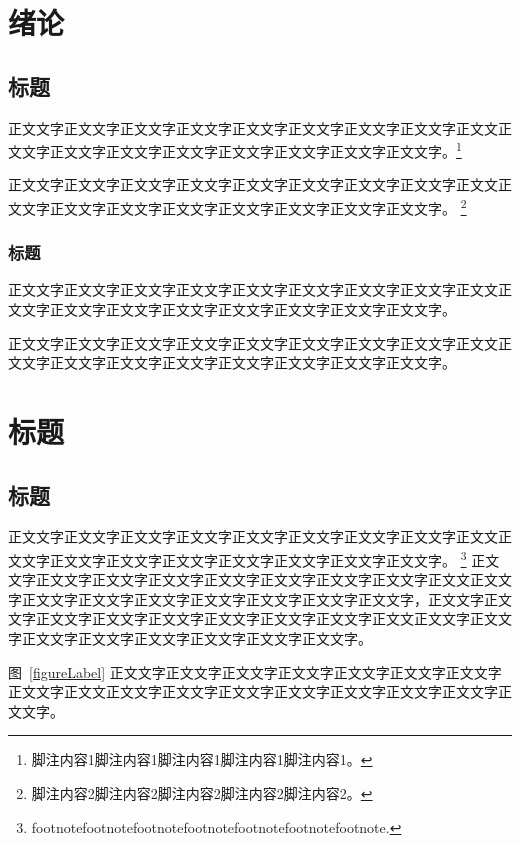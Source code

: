 \documentclass[twoside]{thesis-cls-Miya} %
\begin{document}
\tableofcontents

\mainmatter

\chapter{绪论} %

\section{标题}
正文文字正文文字正文文字正文文字正文文字正文文字正文文字正文文字正文文正文文字正文文字正文文字正文文字正文文字正文文字正文文字正文文字。\footnote{脚注内容1脚注内容1脚注内容1脚注内容1脚注内容1。}

正文文字正文文字正文文字正文文字正文文字正文文字正文文字正文文字正文文正文文字正文文字正文文字正文文字正文文字正文文字正文文字正文文字。
\footnote{脚注内容2脚注内容2脚注内容2脚注内容2脚注内容2。 }

\subsection{标题}
正文文字正文文字正文文字正文文字正文文字正文文字正文文字正文文字正文文正文文字正文文字正文文字正文文字正文文字正文文字正文文字正文文字。

正文文字正文文字正文文字正文文字正文文字正文文字正文文字正文文字正文文正文文字正文文字正文文字正文文字正文文字正文文字正文文字正文文字。

\chapter{标题}%

\section{标题}

正文文字正文文字正文文字正文文字正文文字正文文字正文文字正文文字正文文正文文字正文文字正文文字正文文字正文文字正文文字正文文字正文文字。
\footnote{footnotefootnotefootnotefootnotefootnotefootnotefootnote. }
正文文字正文文字正文文字正文文字正文文字正文文字正文文字正文文字正文文正文文字正文文字正文文字正文文字正文文字正文文字正文文字正文文字\cite{caolin,r1}，正文文字正文文字正文文字正文文字正文文字正文文字正文文字正文文字正文文正文文字正文文字正文文字正文文字正文文字正文文字正文文字正文文字\cite{Nalamura2014,zhongguozhigong,r2}。

图~\ref{figureLabel} 正文文字正文文字正文文字正文文字正文文字正文文字正文文字正文文字正文文正文文字正文文字正文文字正文文字正文文字正文文字正文文字正文文字。
\end{document}
